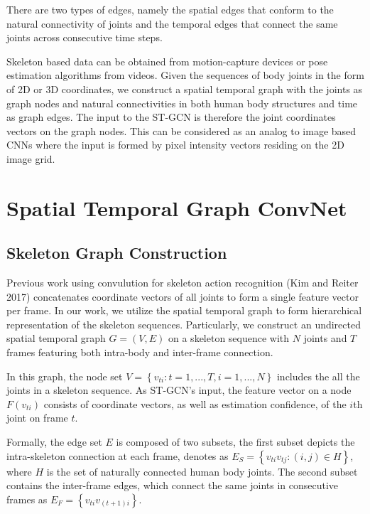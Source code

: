 \documentclass{article}
\begin{document}
There are two types of edges, namely {\color{red}the spatial edges that conform to the natural connectivity of joints and the temporal edges that connect the same joints across consecutive time steps.}

{\color{red}Skeleton based data can be obtained from motion-capture devices or pose estimation algorithms from videos.} Given the sequences of body joints in the form of 2D or 3D coordinates, we construct a spatial temporal graph with the joints as graph nodes and natural connectivities in both human body structures and time as graph edges. The input to the ST-GCN is therefore the joint coordinates vectors on the graph nodes. {\color{red}This can be considered as an analog to image based CNNs where the input is formed by pixel intensity vectors residing on the 2D image grid.}

\section{Spatial Temporal Graph ConvNet}

\subsection{Skeleton Graph Construction}

Previous work using convulution for skeleton action recognition (Kim and Reiter 2017) concatenates coordinate vectors of all joints to form a single feature vector per frame. {\color{red}In our work, we utilize the spatial temporal graph to form hierarchical representation of the skeleton sequences.} Particularly, we construct an undirected spatial temporal graph $G=(V,E)$ on a skeleton sequence with $N$ joints and $T$ frames featuring both intra-body and inter-frame connection.

In this graph, the node set $V=\left\{v_{ti} : t=1,...,T, i=1,...,N \right\}$ includes the all the joints in a skeleton sequence. As ST-GCN's input, the feature vector on a node $F(v_{ti})$ consists of coordinate vectors, as well as estimation confidence, of the $i$th joint on frame $t$.

{\color{red}Formally, the edge set $E$ is composed of two subsets, the first subset depicts the intra-skeleton connection at each frame, denotes as $E_S=\left\{v_{ti}v_{tj}:(i,j)\in H\right\}$, where $H$ is the set of naturally connected human body joints. The second subset contains the inter-frame edges, which connect the same joints in consecutive frames as $E_F=\left\{ v_{ti}v_{(t+1)i}\right\}$.}
\end{document}
